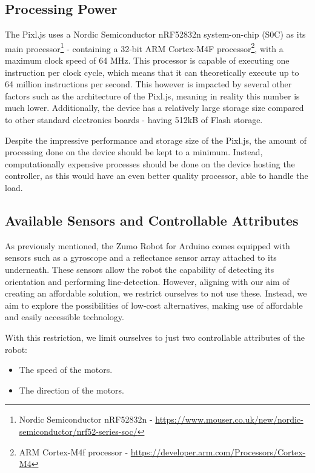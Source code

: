 \documentclass{l4proj}
\begin{document}
\subsection{Processing Power}\label{sec:robot-processing-power}
The Pixl.js uses a Nordic Semiconductor nRF52832n system-on-chip (S0C) as its main processor\footnote{Nordic Semiconductor nRF52832n - \url{https://www.mouser.co.uk/new/nordic-semiconductor/nrf52-series-soc/}} - containing a 32-bit ARM Cortex-M4F processor\footnote{ARM Cortex-M4f processor - \url{https://developer.arm.com/Processors/Cortex-M4}}, with a maximum clock speed of 64 MHz. This processor is capable of executing one instruction per clock cycle, which means that it can theoretically execute up to 64 million instructions per second. This however is impacted by several other factors such as the architecture of the Pixl.js, meaning in reality this number is much lower. Additionally, the device has a relatively large storage size compared to other standard electronics boards - having 512kB of Flash storage.

Despite the impressive performance and storage size of the Pixl.js, the amount of processing done on the device should be kept to a minimum. Instead, computationally expensive processes should be done on the device hosting the controller, as this would have an even better quality processor, able to handle the load.

\subsection{Available Sensors and Controllable Attributes}\label{sec:controllable-attributes}
As previously mentioned, the Zumo Robot for Arduino comes equipped with sensors such as a gyroscope and a reflectance sensor array attached to its underneath. These sensors allow the robot the capability of detecting its orientation and performing line-detection. However, aligning with our aim of creating an affordable solution, we restrict ourselves to not use these. Instead, we aim to explore the possibilities of low-cost alternatives, making use of affordable and easily accessible technology.

With this restriction, we limit ourselves to just two controllable attributes of the robot:
 \begin{itemize}
     \item The speed of the motors.
     \item The direction of the motors.
 \end{itemize}
\end{document}
